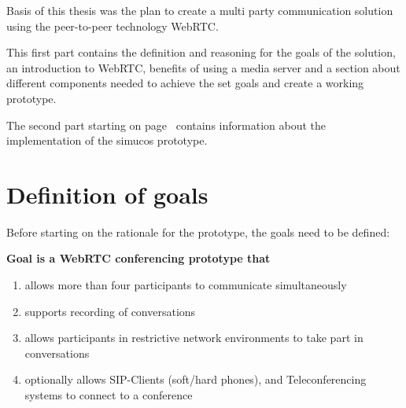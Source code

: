 \documentclass[../../../thesis.tex]{subfiles}
\begin{document}
Basis of this thesis was the plan to create a multi party communication solution using the peer-to-peer technology WebRTC.\par
This first part contains the definition and reasoning for the goals of the solution, an introduction to WebRTC, benefits of using a media server and a section about different components needed to achieve the set goals and create a working prototype.\par
The second part starting on page~\pageref{part:2} contains information about the implementation of the simucos prototype.


\section{Definition of goals}
\label{sec:define-goals}
Before starting on the rationale for the prototype, the goals need to be defined:
\begin{description}
\item{\textbf{Goal is a WebRTC conferencing prototype that}}
\begin{enumerate}
	\item{allows more than four participants to communicate simultaneously}
	\item{supports recording of conversations}
	\item{allows participants in restrictive network environments to take part in conversations}
	\item{optionally allows SIP-Clients (soft/hard phones), and Teleconferencing systems to connect to a conference}
\end{enumerate}
\end{description}
\end{document}
